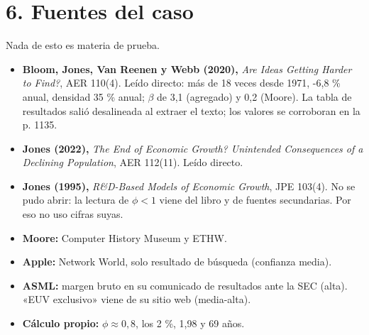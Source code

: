 \documentclass[11pt,a4paper]{article}
\begin{document}
\section*{6. Fuentes del caso}

Nada de esto es materia de prueba.

\begin{itemize}[leftmargin=*,itemsep=2pt,topsep=2pt]
\item \textbf{Bloom, Jones, Van Reenen y Webb (2020),} \emph{Are Ideas Getting Harder to Find?}, AER 110(4). Leído directo: más de 18 veces desde 1971, -6,8 \% anual, densidad 35 \% anual; $\beta$ de 3,1 (agregado) y 0,2 (Moore). La tabla de resultados salió desalineada al extraer el texto; los valores se corroboran en la p. 1135.
\item \textbf{Jones (2022),} \emph{The End of Economic Growth? Unintended Consequences of a Declining Population}, AER 112(11). Leído directo.
\item \textbf{Jones (1995),} \emph{R\&D-Based Models of Economic Growth}, JPE 103(4). No se pudo abrir: la lectura de $\phi < 1$ viene del libro y de fuentes secundarias. Por eso no uso cifras suyas.
\item \textbf{Moore:} Computer History Museum y ETHW.
\item \textbf{Apple:} Network World, solo resultado de búsqueda (confianza media).
\item \textbf{ASML:} margen bruto en su comunicado de resultados ante la SEC (alta). «EUV exclusivo» viene de su sitio web (media-alta).
\item \textbf{Cálculo propio:} $\phi \approx 0{,}8$, los 2 \%, 1,98 y 69 años.
\end{itemize}
\end{document}
